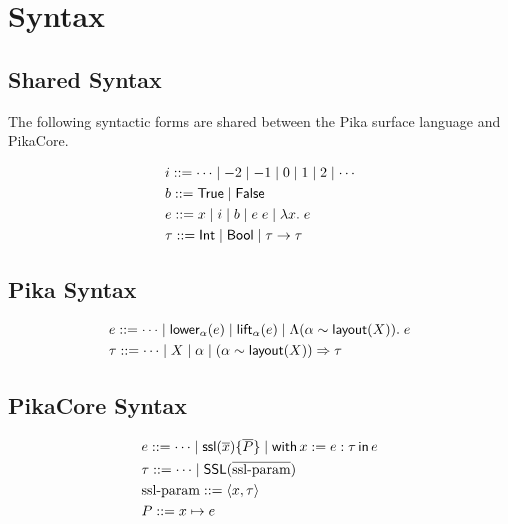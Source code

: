 \section{Syntax}

\subsection{Shared Syntax}

The following syntactic forms are shared between the Pika surface language and PikaCore.

\begin{align*}
  &i ::= \cdots \mid -2 \mid -1 \mid 0 \mid 1 \mid 2 \mid \cdots
  \\
  &b ::= \textsf{True}{} \mid \textsf{False}
  \\
  &e ::= x \mid i \mid b \mid e\; e \mid \lambda x.\; e
  \\
  &\tau ::= \textsf{Int} \mid \textsf{Bool} \mid \tau \rightarrow \tau
\end{align*}

\subsection{Pika Syntax}
\begin{align*}
  &e ::= \cdots \mid \textsf{lower}_{\alpha}(e) \mid \textsf{lift}_{\alpha}(e) \mid \Lambda (\alpha \sim \textsf{layout}(X)).\; e
  \\
  &\tau ::= \cdots \mid X \mid \alpha \mid (\alpha \sim \textsf{layout}(X)) \Rightarrow \tau
\end{align*}

\subsection{PikaCore Syntax}
\begin{align*}
  &e ::= \cdots \mid \textsf{ssl}(\overline{x}) \{ \overline{P} \} \mid \textsf{with}\,x := e : \tau\,\textsf{in}\, e
  \\
  &\tau ::= \cdots \mid \textsf{SSL}(\overline{\textnormal{ssl-param}})
  \\
  &\textnormal{ssl-param} ::= \langle x, \tau \rangle
  \\
  &P ::= x \mapsto e
\end{align*}

